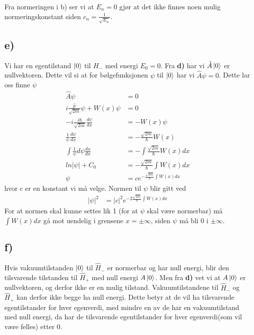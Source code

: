 \documentclass[norsk,a4paper,12pt]{article}
\begin{document}
Fra normeringen i b) ser vi at $E_n = 0$ gjør at det ikke finnes noen mulig normeringskonstant siden $c_n = \frac{1}{\sqrt{E_n}}$.

\subsection*{e)}
Vi har en egentilstand $\ket{0}$ til $\hat{H}_-$ med energi $E_0 = 0$. Fra {\bf d)} har vi $\hat{A}\ket{0}$ er nullvektoren. Dette vil si at for bølgefunksjonen $\psi$ til $\ket{0}$ har vi $\hat{A}\psi = 0$. Dette lar oss finne $\psi$
\begin{equation}
\begin{aligned}
	\hat{A}\psi &= 0 \\
	i \frac{\hat{p}}{\sqrt{2m}}\psi + W(x)\psi &= 0 \\
	-i \frac{i\hbar}{\sqrt{2m}}\frac{d\psi}{d x} &= -W(x)\psi \\
	\frac{1}{\psi}\frac{d\psi}{d x} &= -\frac{\sqrt{2m}}{\hbar}W(x) \\
	\int \frac{1}{\psi}d\psi\frac{d x}{d x} &= - \int \frac{\sqrt{2m}}{\hbar}W(x) dx \\
	ln|\psi| + C_0 &= - \frac{\sqrt{2m}}{\hbar} \int W(x) dx \\
	\psi &= c e^{- \frac{\sqrt{2m}}{\hbar} \int W(x) dx}
\end{aligned}
\end{equation}
hvor c er en konstant vi må velge. Normen til $\psi$ blir gitt ved
\begin{equation}
\begin{aligned}
	|\psi|^2 &= |c|^2 e^{- 2\frac{\sqrt{2m}}{\hbar} \int W(x) dx}
\end{aligned}
\end{equation}
For at normen skal kunne settes lik 1 (for at $\psi$ skal være normerbar) må $\int W(x) dx$ gå mot uendelig i grensene $x = \pm \infty$, siden $\psi$ må bli $0$ i $\pm \infty$.

\subsection*{f)}
Hvis vakuumtilstanden $\ket{0}$ til $\hat{H}_-$ er normerbar og har null energi, blir den tilsvarende tilstanden til $\hat{H}_+$ med null energi $A\ket{0}$. Men fra {\bf d)} vet vi at $A\ket{0}$ er nullvektoren, og derfor ikke er en mulig tilstand. Vakuumtilstandene til $\hat{H}_-$ og $\hat{H}_+$ kan derfor ikke begge ha null energi. Dette betyr at de vil ha tilsvarende egentilstander for hver egenverdi, med mindre en av de har en vakuumtilstand med null energi, da har de tilsvarende egentilstander for hver egenverdi(som vil være felles) etter 0.
\end{document}
